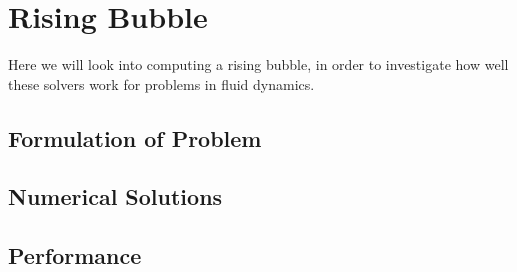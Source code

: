 \section{Rising Bubble}

Here we will look into computing a rising bubble, in order to investigate how well these solvers work for problems in fluid dynamics.
\subsection{Formulation of Problem}

\subsection{Numerical Solutions}

\subsection{Performance}